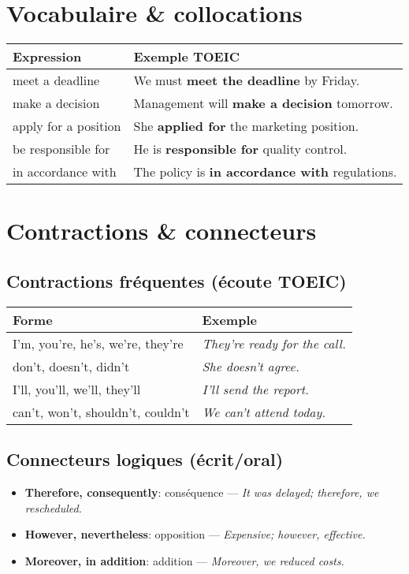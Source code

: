 \documentclass[11pt,a4paper]{article}
\begin{document}
\section{Vocabulaire \& collocations}
\begin{center}
\begin{tabular}{@{}L{4.5cm} L{10cm}@{}}
\toprule
\textbf{Expression} & \textbf{Exemple TOEIC} \\
\midrule
meet a deadline & We must \textbf{meet the deadline} by Friday. \\
make a decision & Management will \textbf{make a decision} tomorrow. \\
apply for a position & She \textbf{applied for} the marketing position. \\
be responsible for & He is \textbf{responsible for} quality control. \\
in accordance with & The policy is \textbf{in accordance with} regulations. \\
\bottomrule
\end{tabular}
\end{center}

\section{Contractions \& connecteurs}

\subsection*{Contractions fréquentes (écoute TOEIC)}
\begin{center}
\begin{tabular}{@{}L{5cm} L{9.5cm}@{}}
\toprule
\textbf{Forme} & \textbf{Exemple} \\
\midrule
I'm, you're, he's, we're, they're & \textit{They're ready for the call.} \\
don't, doesn't, didn't & \textit{She doesn't agree.} \\
I'll, you'll, we'll, they'll & \textit{I'll send the report.} \\
can't, won't, shouldn't, couldn't & \textit{We can't attend today.} \\
\bottomrule
\end{tabular}
\end{center}

\subsection*{Connecteurs logiques (écrit/oral)}
\begin{itemize}
  \item \textbf{Therefore, consequently}: conséquence \;—\; \textit{It was delayed; therefore, we rescheduled.}
  \item \textbf{However, nevertheless}: opposition \;—\; \textit{Expensive; however, effective.}
  \item \textbf{Moreover, in addition}: addition \;—\; \textit{Moreover, we reduced costs.}
\end{itemize}
\end{document}
